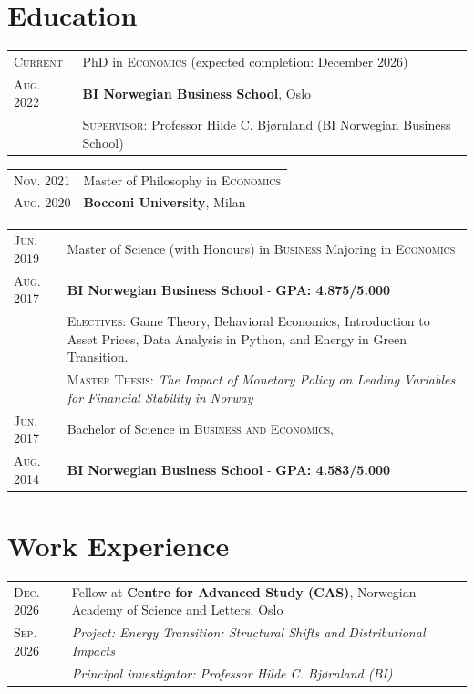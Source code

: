 \documentclass[a4paper,15pt]{article}
\begin{document}
\section{Education}
\begin{tabular}{p{2.4cm} | p{12.9cm} }
 \small{\textsc{Current}}   & PhD in \textsc{Economics} (expected completion: December 2026)\\
 \small{\textsc{Aug. 2022 }} & \textbf{BI Norwegian Business School}, Oslo \\
 &  \footnotesize{\textsc{Supervisor}}:\footnotesize{ Professor Hilde C. Bjørnland (BI Norwegian Business School)}\\
\end{tabular}
\begin{tabular}{p{2.4cm} | p{12.9cm} }
 \small{\textsc{Nov. 2021}}   & Master of Philosophy in \textsc{Economics}\\
 \small{\textsc{Aug. 2020 }} & \textbf{Bocconi University}, Milan \\
\end{tabular}
\begin{tabular}{p{2.4cm} | p{12.9cm} }
\small{\textsc{Jun. 2019 }}  & Master of Science (with Honours) in \textsc{Business} Majoring in \textsc{Economics}\\
\small{\textsc{Aug. 2017 }} & \textbf{BI Norwegian Business School} - \textbf{GPA: 4.875/5.000} \\
 &  \footnotesize{\textsc{Electives}}:\footnotesize{ Game Theory, Behavioral Economics, Introduction to Asset Prices, Data Analysis in Python, and Energy in Green Transition.}\\
 & \footnotesize{\textsc{Master Thesis}}:\footnotesize{ \emph{The Impact of Monetary Policy on Leading Variables for Financial Stability in Norway}}
 \multicolumn{2}{c}{} \\
\small{\textsc{Jun. 2017}}& Bachelor of Science in \textsc{Business and Economics,}  \\
\small{\textsc{Aug. 2014}} & \textbf{BI Norwegian Business School} - \textbf{GPA: 4.583/5.000 }\\
\end{tabular}
\section{Work Experience}
\begin{tabular}{p{2.4cm} | p{12.9cm} }
  \small{\textsc{Dec. 2026}} & Fellow at \textbf{Centre for Advanced Study (CAS)}, Norwegian Academy of Science and Letters, Oslo\\
  \small{\textsc{Sep. 2026}}& \emph{Project: Energy Transition: Structural Shifts and Distributional Impacts} \\
  & \emph{Principal investigator: Professor Hilde C. Bjørnland (BI)} \\
\end{tabular}
\end{document}

